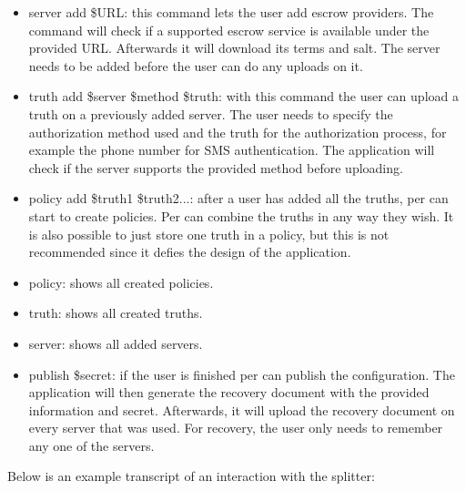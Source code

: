 \begin{itemize}
\item server add \$URL: this command lets the user add escrow
  providers. The command will check if a supported escrow service is
  available under the provided URL. Afterwards it will download its
  terms and salt. The server needs to be added before the user can do
  any uploads on it.
\item truth add \$server \$method \$truth: with this command the user
  can upload a truth on a previously added server. The user needs to
  specify the authorization method used and the truth for the
  authorization process, for example the phone number for SMS
  authentication.  The application will check if the server supports the
  provided method before uploading.
\item policy add \$truth1 \$truth2...: after a user has added all the
  truths, per can start to create policies. Per can combine the truths
  in any way they wish. It is also possible to just store one truth in
  a policy, but this is not recommended since it defies the design of
  the application.
\item policy: shows all created policies.
\item truth: shows all created truths.
\item server: shows all added servers.
\item publish \$secret: if the user is finished per can publish the
  configuration. The application will then generate the recovery
  document with the provided information and secret. Afterwards, it
  will upload the recovery document on every server that was used. For
  recovery, the user only needs to remember any one of the servers.
\end{itemize}

Below is an example transcript of an interaction with the splitter:

